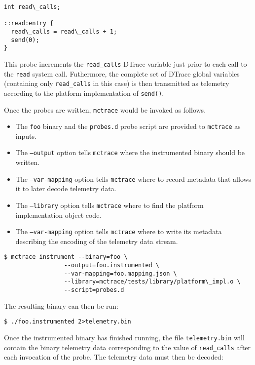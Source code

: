 \begin{verbatim}
int read\_calls;

::read:entry {
  read\_calls = read\_calls + 1;
  send(0);
}
\end{verbatim}

This probe increments the \texttt{read\_calls} DTrace variable just prior to
each call to the \texttt{read} system call. Futhermore, the complete set of
DTrace global variables (containing only \texttt{read\_calls} in this case) is
then transmitted as telemetry according to the platform implementation
of \texttt{send()}.

Once the probes are written, \texttt{mctrace} would be invoked as follows.
\begin{itemize}
\item The \texttt{foo} binary and the \texttt{probes.d} probe script are provided to
  \texttt{mctrace} as inputs.
\item The \texttt{--output} option tells \texttt{mctrace} where the instrumented binary
  should be written.
\item The \texttt{--var-mapping} option tells \texttt{mctrace} where to record metadata
  that allows it to later decode telemetry data.
\item The \texttt{--library} option tells \texttt{mctrace} where to find the platform
  implementation object code.
\item The \texttt{--var-mapping} option tells \texttt{mctrace} where to write its metadata  describing the encoding of the telemetry data stream.
\end{itemize}

\begin{verbatim}
$ mctrace instrument --binary=foo \
                 --output=foo.instrumented \
                 --var-mapping=foo.mapping.json \
                 --library=mctrace/tests/library/platform\_impl.o \
                 --script=probes.d
\end{verbatim}

The resulting binary can then be run:

\begin{verbatim}
$ ./foo.instrumented 2>telemetry.bin 
\end{verbatim}

Once the instrumented binary has finished running, the file
\texttt{telemetry.bin} will contain the binary telemetry data corresponding
to the value of \texttt{read\_calls} after each invocation of the probe. The
telemetry data must then be decoded:

